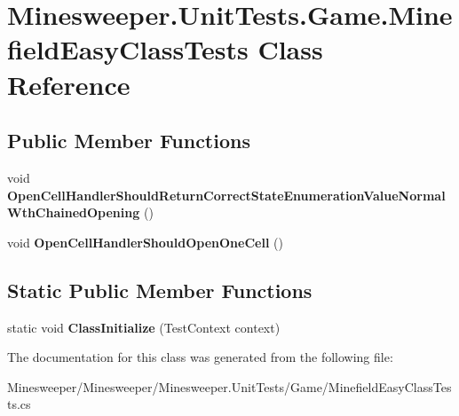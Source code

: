 \hypertarget{class_minesweeper_1_1_unit_tests_1_1_game_1_1_minefield_easy_class_tests}{\section{Minesweeper.\+Unit\+Tests.\+Game.\+Minefield\+Easy\+Class\+Tests Class Reference}
\label{class_minesweeper_1_1_unit_tests_1_1_game_1_1_minefield_easy_class_tests}
}
\subsection*{Public Member Functions}
\begin{DoxyCompactItemize}
\item 
\hypertarget{class_minesweeper_1_1_unit_tests_1_1_game_1_1_minefield_easy_class_tests_af1ac9c0942dae4d7d39985f3b276128d}{void {\bfseries Open\+Cell\+Handler\+Should\+Return\+Correct\+State\+Enumeration\+Value\+Normal\+Wth\+Chained\+Opening} ()}\label{class_minesweeper_1_1_unit_tests_1_1_game_1_1_minefield_easy_class_tests_af1ac9c0942dae4d7d39985f3b276128d}

\item 
\hypertarget{class_minesweeper_1_1_unit_tests_1_1_game_1_1_minefield_easy_class_tests_a09cdda447e48fa8542a0233c13ab5b7e}{void {\bfseries Open\+Cell\+Handler\+Should\+Open\+One\+Cell} ()}\label{class_minesweeper_1_1_unit_tests_1_1_game_1_1_minefield_easy_class_tests_a09cdda447e48fa8542a0233c13ab5b7e}

\end{DoxyCompactItemize}
\subsection*{Static Public Member Functions}
\begin{DoxyCompactItemize}
\item 
\hypertarget{class_minesweeper_1_1_unit_tests_1_1_game_1_1_minefield_easy_class_tests_a42609016f0a7b5c3efc3f5774d3cde2e}{static void {\bfseries Class\+Initialize} (Test\+Context context)}\label{class_minesweeper_1_1_unit_tests_1_1_game_1_1_minefield_easy_class_tests_a42609016f0a7b5c3efc3f5774d3cde2e}

\end{DoxyCompactItemize}


The documentation for this class was generated from the following file\+:\begin{DoxyCompactItemize}
\item 
Minesweeper/\+Minesweeper/\+Minesweeper.\+Unit\+Tests/\+Game/Minefield\+Easy\+Class\+Tests.\+cs\end{DoxyCompactItemize}

